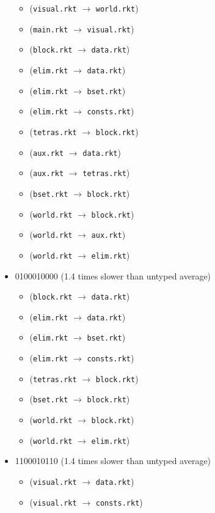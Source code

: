 \documentclass{article}
\newcommand{\mono}[1]{\texttt{#1}}
\begin{document}
\begin{itemize}
\begin{itemize}
  \item (\mono{visual.rkt} $\rightarrow$ \mono{world.rkt})
  \item (\mono{main.rkt} $\rightarrow$ \mono{visual.rkt})
  \item (\mono{block.rkt} $\rightarrow$ \mono{data.rkt})
  \item (\mono{elim.rkt} $\rightarrow$ \mono{data.rkt})
  \item (\mono{elim.rkt} $\rightarrow$ \mono{bset.rkt})
  \item (\mono{elim.rkt} $\rightarrow$ \mono{consts.rkt})
  \item (\mono{tetras.rkt} $\rightarrow$ \mono{block.rkt})
  \item (\mono{aux.rkt} $\rightarrow$ \mono{data.rkt})
  \item (\mono{aux.rkt} $\rightarrow$ \mono{tetras.rkt})
  \item (\mono{bset.rkt} $\rightarrow$ \mono{block.rkt})
  \item (\mono{world.rkt} $\rightarrow$ \mono{block.rkt})
  \item (\mono{world.rkt} $\rightarrow$ \mono{aux.rkt})
  \item (\mono{world.rkt} $\rightarrow$ \mono{elim.rkt})
  \end{itemize}
\item 0100010000 (1.4 times slower than untyped average)
  \begin{itemize}
  \item (\mono{block.rkt} $\rightarrow$ \mono{data.rkt})
  \item (\mono{elim.rkt} $\rightarrow$ \mono{data.rkt})
  \item (\mono{elim.rkt} $\rightarrow$ \mono{bset.rkt})
  \item (\mono{elim.rkt} $\rightarrow$ \mono{consts.rkt})
  \item (\mono{tetras.rkt} $\rightarrow$ \mono{block.rkt})
  \item (\mono{bset.rkt} $\rightarrow$ \mono{block.rkt})
  \item (\mono{world.rkt} $\rightarrow$ \mono{block.rkt})
  \item (\mono{world.rkt} $\rightarrow$ \mono{elim.rkt})
  \end{itemize}
\item 1100010110 (1.4 times slower than untyped average)
  \begin{itemize}
  \item (\mono{visual.rkt} $\rightarrow$ \mono{data.rkt})
  \item (\mono{visual.rkt} $\rightarrow$ \mono{consts.rkt})

\end{itemize}
\end{itemize}
\end{document}

